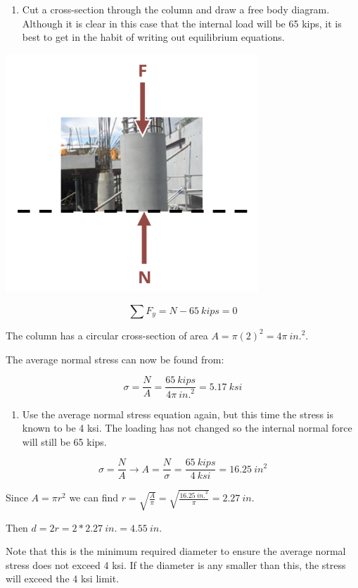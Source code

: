 \documentclass[
  letterpaper,
  DIV=11,
  numbers=noendperiod]{scrreprt}
\providecommand{\tightlist}{%
  \setlength{\itemsep}{0pt}\setlength{\parskip}{0pt}}\usepackage{longtable,booktabs,array}
\begin{document}
\begin{tcolorbox}
\begin{tcolorbox}
\begin{enumerate}
\def\labelenumi{\arabic{enumi}.}
\tightlist
\item
  Cut a cross-section through the column and draw a free body diagram.
  Although it is clear in this case that the internal load will be 65
  kips, it is best to get in the habit of writing out equilibrium
  equations.
\end{enumerate}

\begin{center}
\includegraphics[width=3.73958in,height=\textheight]{images/CH2 figures/example 2.1 part 2.png}
\end{center}

\[
\sum F_y= N-65{~kips}=0
\]

The column has a circular cross-section of area
\(A=\pi(2)^2=4 \pi{~in.}^2\).

The average normal stress can now be found from:

\[
\sigma=\frac{N}{A}=\frac{65{~kips}}{4 \pi{~in.}^2}=5.17{~ksi}
\]

\begin{enumerate}
\def\labelenumi{\arabic{enumi}.}
\setcounter{enumi}{1}
\tightlist
\item
  Use the average normal stress equation again, but this time the stress
  is known to be 4 ksi. The loading has not changed so the internal
  normal force will still be 65 kips.
\end{enumerate}

\[
\sigma=\frac{N}{A} \rightarrow A=\frac{N}{\sigma}=\frac{65{~kips}}{4{~ksi}}=16.25 {~in}^2
\]

Since \(A=\pi r^2\) we can find
\(r=\sqrt{\frac{A}{\pi}}=\sqrt{\frac{16.25{~in.}^2}{\pi}}=2.27{~in}\).

Then \(d=2 r=2 * 2.27{~in.}=4.55{~in.}\)

Note that this is the minimum required diameter to ensure the average
normal stress does not exceed 4 ksi. If the diameter is any smaller than
this, the stress will exceed the 4 ksi limit.

\end{tcolorbox}

\end{tcolorbox}
\end{document}
